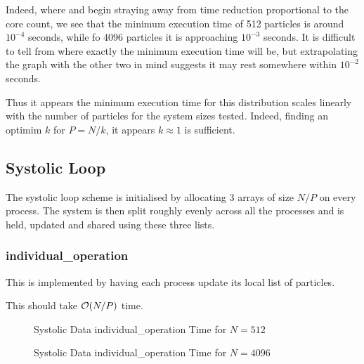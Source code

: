 Indeed, where
and
begin straying away from time reduction proportional to the core count,
we see that the minimum execution time of 512 particles is around
$10^{-4}$ seconds, while fo 4096 particles it is approaching
$10^{-3}$ seconds.
%
It is difficult to tell from
where exactly the minimum execution time will be, but
extrapolating the graph with the other two in mind suggests it may
rest somewhere within $10^{-2}$ seconds.

Thus it appears the minimum execution time for this distribution
scales linearly with the number of particles for the system sizes tested.
%
Indeed, finding an optimim $k$ for $P=N/k$, it appears $k \approx{} 1$
is sufficient.



\subsection{Systolic Loop}

The systolic loop scheme is initialised by allocating 3 arrays of
size $N/P$ on every process.
%
The system is then split roughly evenly across all the processes
and is held, updated and shared using these three lists.


%
%

\subsubsection{individual\_operation}
This is implemented by having each process update its local list
of particles.

This should take $\mathcal{O}{(N/P)}$ time.

\begin{figure}
    
    \caption{Systolic Data individual\_operation Time for $N = 512$}
    \label{fig:v0_systolic_individual_operation_512_logtime}
\end  {figure}

\begin{figure}
    
    \caption{Systolic Data individual\_operation Time for $N = 4096$}
    \label{fig:v0_systolic_individual_operation_4096_logtime}
\end  {figure}

